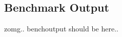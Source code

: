 \landscape
\begin{multicols}{2}
\tiny
\section{Benchmark Output}
zomg.. benchoutput should be here.. 
\end{multicols}
